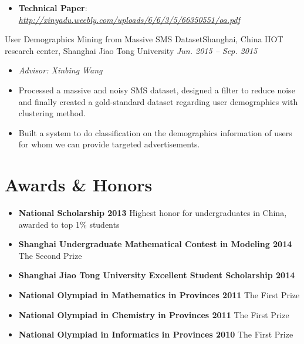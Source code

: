 \documentclass[letterpaper,12pt]{resume}
\begin{document}
\begin{itemize}
{\begin{itemize}
        \item{ \textbf{Technical Paper}: \textit{\footnotesize \url{http://xinyadu.weebly.com/uploads/6/6/3/5/66350551/oa.pdf}}}%
       
    \end{itemize}
    }
    
     \credential
    {User Demographics Mining from Massive SMS Dataset}{Shanghai, China}
    {IIOT research center, Shanghai Jiao Tong University}
    {\textit{Jun. 2015 -- Sep. 2015}}
    {
    \begin{itemize}
    \item{ \textit{Advisor: Xinbing Wang}}
      
	 \item{Processed a massive and noisy SMS dataset, designed a filter to reduce noise and finally created a gold-standard dataset regarding user demographics with clustering method.}
	 \item{Built a system to do classification on the demographics information of users for whom we can provide targeted advertisements. }
    \end{itemize}
    }


\end{itemize}  %

\pagebreak





\section{Awards \& Honors}
\begin{itemize}
\item {\bf National Scholarship 2013} {\footnotesize Highest honor for undergraduates in China, awarded to top 1\% students}

\item {\bf Shanghai Undergraduate Mathematical Contest in Modeling 2014} {\footnotesize The Second Prize}
    
   \item {\bf Shanghai Jiao Tong University Excellent Student Scholarship 2014}
   
    \item {\bf National Olympiad in Mathematics in Provinces 2011} {\footnotesize The First Prize }
    \item {\bf National Olympiad in Chemistry in Provinces 2011}
    {\footnotesize The First Prize}
  \item {\bf National Olympiad in Informatics in Provinces 2010}
 {\footnotesize The First Prize }
   


 \end{itemize}  %
\end{document}
